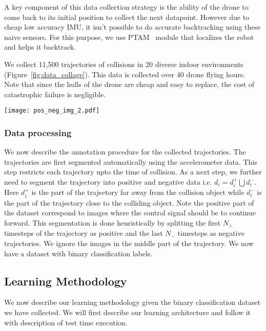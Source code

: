 \documentclass[letterpaper, 10 pt, conference]{ieeeconf}  %
\begin{document}
A key component of this data collection strategy is the ability of the drone to come back to its initial position to collect the next datapoint. However due to cheap low accuracy IMU, it isn't possible to do accurate backtracking using these naive sensors. For this purpose, we use PTAM~\cite{klein07parallel} module that localizes the robot and helps it backtrack.

We collect 11,500 trajectories of collisions in 20 diverse indoor environments (Figure~\ref{fig:data_collage}). This data is collected over 40 drone flying hours. Note that since the hulls of the drone are cheap and easy to replace, the cost of catastrophic failure is negligible.

\begin{figure*}[t!]
\centering
\texttt{[image: pos\_neg\_img\_2.pdf]}
\caption{Given the data collected from drone collisions, we can extract portions of trajectories into two sections; first one very close to the objects~(red box) \& second far away from the objects~(green box).}
\label{fig:data_collage}
\end{figure*}\subsubsection{Data processing}
We now describe the annotation procedure for the collected trajectories. The trajectories are first segmented automatically using the accelerometer data. This step restricts each trajectory upto the time of collision. As a next step, we further need to segment the trajectory into positive and negative data i.e. $d_i = d^{+}_i\bigcup d^{-}_i$. Here $d^{+}_i$ is the part of the trajectory far away from the collision object while $d^{-}_i$ is the part of the trajectory close to the colliding object. Note the positive part of the dataset correspond to images where the control signal should be to continue forward. This segmentation is done heuristically by splitting the first $N_{+}$ timesteps of the trajectory as positive and the last $N_{-}$ timesteps as negative trajectories. We ignore the images in the middle part of the trajectory. We now have a dataset with binary classification labels.

\subsection{Learning Methodology}
We now describe our learning methodology given the binary classification dataset we have collected. We will first describe our learning architecture and follow it with description of test time execution.
\end{document}
